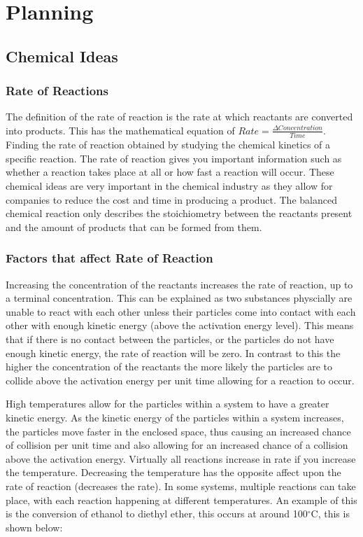 \chapter {Planning}

\section {Chemical Ideas}


	\subsection{Rate of Reactions}

The definition of the rate of reaction is the rate at which reactants are converted into products. This has the mathematical equation of $Rate = \frac{\Delta Concentration}{Time}$. Finding the rate of reaction obtained by studying the chemical kinetics of a specific reaction. The rate of reaction gives you important information such as whether a reaction takes place at all or how fast a reaction will occur. These chemical ideas are very important in the chemical industry as they allow for companies to reduce the cost and time in producing a product. The balanced chemical reaction only describes the stoichiometry between the reactants present and the amount of products that can be formed from them. 

	\subsection{Factors that affect Rate of Reaction}

Increasing the concentration of the reactants increases the rate of reaction, up to a terminal concentration. This can be explained as two substances physcially are unable to react with each other unless their particles come into contact with each other with enough kinetic energy (above the activation energy level). This means that if there is no contact between the particles, or the particles do not have enough kinetic energy, the rate of reaction will be zero. In contrast to this the higher the concentration of the reactants the more likely the particles are to collide above the activation energy per unit time allowing for a reaction to occur.

High temperatures allow for the particles within a system to have a greater kinetic energy. As the kinetic energy of the particles within a system increases, the particles move faster in the enclosed space, thus causing an increased chance of collision per unit time and also allowing for an increased chance of a collision above the activation energy. Virtually all reactions increase in rate if you increase the temperature. Decreasing the temperature has the opposite affect upon the rate of reaction (decreases the rate). In some systems, multiple reactions can take place, with each reaction happening at different temperatures. An example of this is the conversion of ethanol to diethyl ether, this occurs at around 100$^{\circ}$C, this is shown below:

